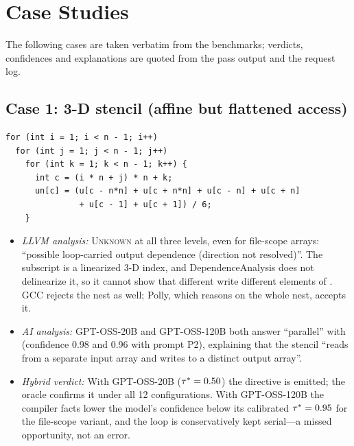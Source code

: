 \section{Case Studies}
\label{sec:cases}
The following cases are taken verbatim from the benchmarks; verdicts, confidences and explanations are quoted from the pass output and the request log.

\subsection{Case 1: 3-D stencil (affine but flattened access)}
\begin{lstlisting}[style=customc, caption={7-point Jacobi relaxation (\Code{st\_jacobi3d}, HF-LoopBench).}, label={lst:jacobi}]
for (int i = 1; i < n - 1; i++)
  for (int j = 1; j < n - 1; j++)
    for (int k = 1; k < n - 1; k++) {
      int c = (i * n + j) * n + k;
      un[c] = (u[c - n*n] + u[c + n*n] + u[c - n] + u[c + n]
               + u[c - 1] + u[c + 1]) / 6;
    }
\end{lstlisting}
\begin{itemize}
    \item \textit{LLVM analysis:} \textsc{Unknown} at all three levels, even for file-scope arrays: ``possible loop-carried output dependence (direction not resolved)''. The subscript  is a linearized 3-D index, and DependenceAnalysis does not delinearize it, so it cannot show that different  write different elements of . GCC rejects the nest as well; Polly, which reasons on the whole nest, accepts it.
    \item \textit{AI analysis:} GPT-OSS-20B and GPT-OSS-120B both answer ``parallel'' with  (confidence 0.98 and 0.96 with prompt P2), explaining that the stencil ``reads from a separate input array and writes to a distinct output array''.
    \item \textit{Hybrid verdict:} With GPT-OSS-20B ($\tau^*=0.50$) the directive is emitted; the oracle confirms it under all 12 configurations. With GPT-OSS-120B the compiler facts lower the model's confidence below its calibrated $\tau^*=0.95$ for the file-scope variant, and the loop is conservatively kept serial---a missed opportunity, not an error.
\end{itemize}

